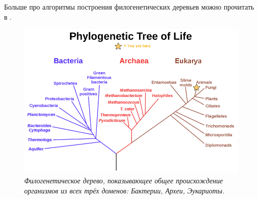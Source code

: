 \documentclass[11pt,a4paper]{report}
\theoremstyle{definition}
\theoremstyle{definition}
\theoremstyle{definition}
\begin{document}
	\noindent Больше про алгоритмы построения филогенетических деревьев можно прочитать в \cite{Hungary}.
	\begin{figure}[!hbtp]
		\includegraphics[width=\textwidth]{./img/phylogenetic_tree.jpg}
		\caption{\textit{Филогенетическое дерево, показывающее общее происхождение организмов из всех трёх доменов: Бактерии, Археи, Эукариоты.}}
	\end{figure}
	\clearpage
\end{document}

